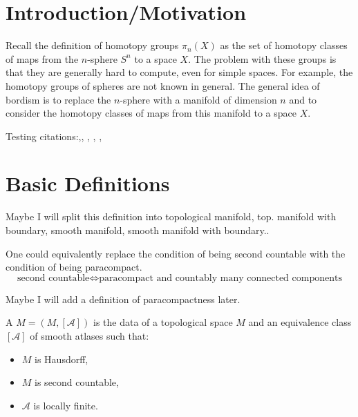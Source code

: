 \documentclass[a4paper,11pt]{article}
\begin{document}
\maketitle
{}
\tableofcontents
{}

\setcounter{section}{-1}

\section{Introduction/Motivation}

Recall the definition of homotopy groups \(\pi_n(X)\) as the set of homotopy classes of maps from the \(n\)-sphere \(S^n\) to a space \(X\). 
The problem with these groups is that they are generally hard to compute, even for simple spaces. 
For example, the homotopy groups of spheres are not known in general.
The general idea of bordism is to replace the \(n\)-sphere with a manifold of dimension \(n\) and to consider the homotopy classes of maps from this manifold to a space \(X\).

Testing citations:\cite{atiyah},\cite{brocker}, \cite{thom}, \cite{lee}, \cite{hatcher}, \cite{dieck}

\section{Basic Definitions}

Maybe I will split this definition into topological manifold, top. manifold with boundary, smooth manifold, smooth manifold with boundary..

\begin{remark}
    One could equivalently replace the condition of being second countable with the condition of being paracompact.
    \[\text{second countable}\iff\text{paracompact and countably many connected components}\]
\end{remark}
Maybe I will add a definition of paracompactness later.

\begin{definition}[Manifold]
    A  \(M=(M,[\mathcal{A}])\) is the data of a topological space \(M\) and an equivalence class \([\mathcal{A}]\) of smooth atlases such that:
    \begin{itemize}
        \item \(M\) is Hausdorff,
        \item \(M\) is second countable,
        \item \(\mathcal{A}\) is locally finite.
    \end{itemize}
\end{definition}
\end{document}

